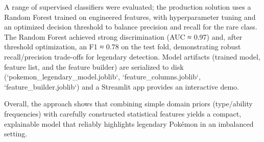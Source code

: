 A range of supervised classifiers were evaluated; the production solution uses a Random Forest trained on engineered features, with hyperparameter tuning and an optimized decision threshold to balance precision and recall for the rare class. The Random Forest achieved strong discrimination (AUC ≈ 0.97) and, after threshold optimization, an F1 ≈ 0.78 on the test fold, demonstrating robust recall/precision trade-offs for legendary detection. Model artifacts (trained model, feature list, and the feature builder) are serialized to disk (`pokemon_legendary_model.joblib`, `feature_columns.joblib`, `feature_builder.joblib`) and a Streamlit app provides an interactive demo.

Overall, the approach shows that combining simple domain priors (type/ability frequencies) with carefully constructed statistical features yields a compact, explainable model that reliably highlights legendary Pokémon in an imbalanced setting.
